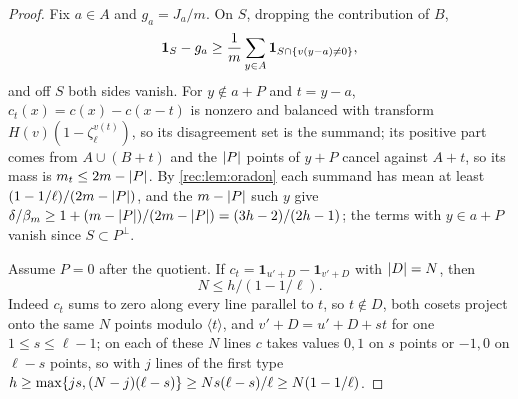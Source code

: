 \begin{proof}
Fix $a\in A$ and $g_a=J_a/m$. On $S$, dropping the contribution of $B$,
\begin{equation}\label{rec:eq:oanchor}
 \mathbf 1_S-g_a\ge\frac1m\sum_{y\in A}\mathbf 1_{S\cap\{v(y-a)\ne0\}},
\end{equation}
and off $S$ both sides vanish. For $y\notin a+P$ and $t=y-a$, $c_t(x)=c(x)-c(x-t)$ is nonzero and balanced with
transform $H(v)(1-\zeta_\ell^{v(t)})$, so its disagreement set is the summand; its positive part comes from $A\cup(B+t)$
and the $\lvert P\rvert$ points of $y+P$ cancel against $A+t$, so its mass is $m_t\le2m-\lvert P\rvert$. By \cref{rec:lem:oradon} each
summand has mean at least $(1-1/\ell)/(2m-\lvert P\rvert)$, and the $m-\lvert P\rvert$ such $y$ give
$\delta/\beta_m\ge1+(m-\lvert P\rvert)/(2m-\lvert P\rvert)=(3h-2)/(2h-1)$; the terms with $y\in a+P$ vanish since $S\subset P^\perp$.

Assume $P=0$ after the quotient. If $c_t=\mathbf 1_{u'+D}-\mathbf 1_{v'+D}$ with $\lvert D\rvert=N$, then
\begin{equation}\label{rec:eq:oflat}
 N\le h/(1-1/\ell).
\end{equation}
Indeed $c_t$ sums to zero along every line parallel to $t$, so $t\notin D$, both cosets project onto the same $N$ points
modulo $\langle t\rangle$, and $v'+D=u'+D+st$ for one $1\le s\le\ell-1$; on each of these $N$ lines $c$ takes values $0,1$ on
$s$ points or $-1,0$ on $\ell-s$ points, so with $j$ lines of the first type
$h\ge\max\{js,(N-j)(\ell-s)\}\ge Ns(\ell-s)/\ell\ge N(1-1/\ell)$.


\end{proof}
